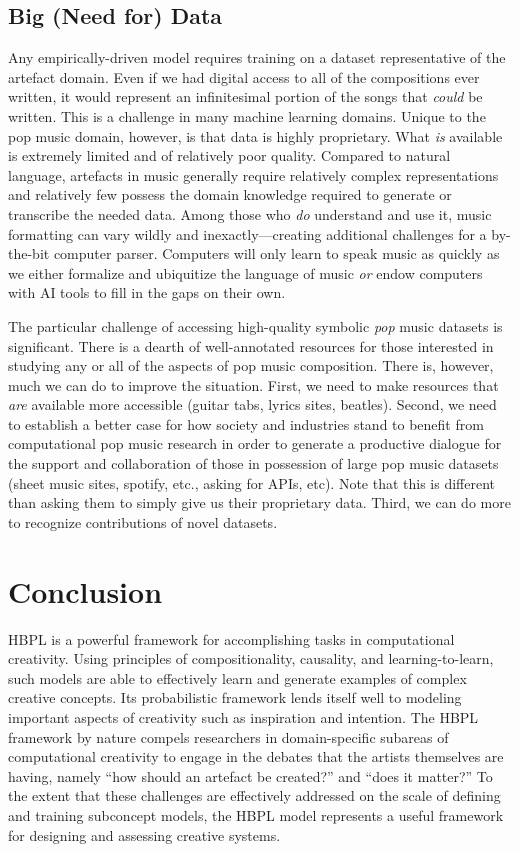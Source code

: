 \documentclass[letterpaper]{article}
\begin{document}
\subsection{Big (Need for) Data}

Any empirically-driven model requires training on a dataset representative of the artefact domain. Even if we had digital access to all of the compositions ever written, it would represent an infinitesimal portion of the songs that \emph{could} be written. This is a challenge in many machine learning domains. Unique to the pop music domain, however, is that data is highly proprietary. What \textit{is} available is extremely limited and of relatively poor quality. Compared to natural language, artefacts in music generally require relatively complex representations and relatively few possess the domain knowledge required to generate or transcribe the needed data. Among those who \textit{do} understand and use it, music formatting can vary wildly and inexactly---creating additional challenges for a by-the-bit computer parser. Computers will only learn to speak music as quickly as we either formalize and ubiquitize the language of music \textit{or} endow computers with AI tools to fill in the gaps on their own.

The particular challenge of accessing high-quality symbolic \emph{pop} music datasets is significant. There is a dearth of well-annotated resources for those interested in studying any or all of the aspects of pop music composition. There is, however, much we can do to improve the situation. First, we need to make resources that \textit{are} available more accessible (guitar tabs, lyrics sites, beatles). Second, we need to establish a better case for how society and industries stand to benefit from computational pop music research in order to generate a productive dialogue for the support and collaboration of those in possession of large pop music datasets (sheet music sites, spotify, etc., asking for APIs, etc). Note that this is different than asking them to simply give us their proprietary data. Third, we can do more to recognize contributions of novel datasets.

\section{Conclusion}

HBPL is a powerful framework for accomplishing tasks in computational creativity. Using principles of compositionality, causality, and learning-to-learn, such models are able to effectively learn and generate examples of complex creative concepts. Its probabilistic framework lends itself well to modeling important aspects of creativity such as inspiration and intention. The HBPL framework by nature compels researchers in domain-specific subareas of computational creativity to engage in the debates that the artists themselves are having, namely ``how should an artefact be created?'' and ``does it matter?'' To the extent that these challenges are effectively addressed on the scale of defining and training subconcept models, the HBPL model represents a useful framework for designing and assessing creative systems.



\end{document}
